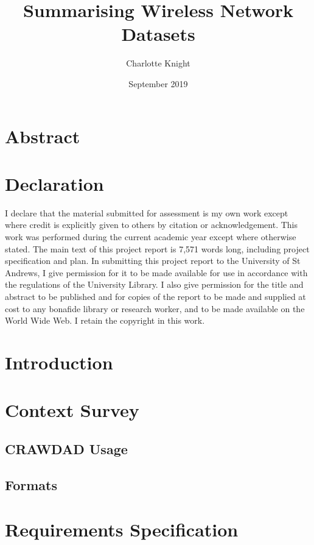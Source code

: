 \documentclass{article}
\title{Summarising Wireless Network Datasets}
\author{Charlotte Knight}
\date{September 2019}
\begin{document}
\maketitle

\section*{Abstract}

\label{section:abst}
\newpage
\section*{Declaration}
I declare that the material submitted for assessment is my own work except where credit is explicitly given to others by citation or acknowledgement. This work was performed during the current academic year except where otherwise stated. 
The main text of this project report is 7,571 words long, including project specification and plan. 
In submitting this project report to the University of St Andrews, I give permission for it to be made available for use in accordance with the regulations of the University Library. I also give permission for the title and abstract to be published and for copies of the report to be made and supplied at cost to any bonafide library or research worker, and to be made available on the World Wide Web. I retain the copyright in this work.

\newpage
\tableofcontents
\newpage

\section{Introduction}
\label{section:intro}


\section{Context Survey}
\label{section:context}
    \subsection{CRAWDAD Usage}
    \label{section:useage}
    
    
    \subsection{Formats}
    \label{section:formats}
    

\section{Requirements Specification}
\label{section:req}

\end{document}
